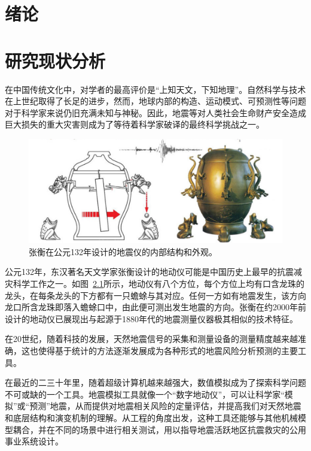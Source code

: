 \documentclass[degree=doctor]{thuthesis}
\begin{document}
\frontmatter

\tableofcontents




\mainmatter

\chapter{绪论}

\chapter{研究现状分析}

在中国传统文化中，对学者的最高评价是“上知天文，下知地理”。自然科学与技术在上世纪取得了长足的进步，然而，地球内部的构造、运动模式、可预测性等问题对于科学家来说仍旧充满未知与神秘。因此，地震等对人类社会生命财产安全造成巨大损失的重大灾害则成为了等待着科学家破译的最终科学挑战之一\citep{anderson1989theory}。

\begin{figure}[t]
\centering
\includegraphics[width=0.7\columnwidth]{seismoscope.png}
\caption{张衡在公元132年设计的地震仪的内部结构和外观\citep{hsiao2009review}。}
\label{fig:heng-scope}
\end{figure}

公元132年，东汉著名天文学家张衡设计的地动仪可能是中国历史上最早的抗震减灾科学工作之一\citep{stein2009introduction}。如图~\ref{fig:heng-scope}所示，地动仪有八个方位，每个方位上均有口含龙珠的龙头，在每条龙头的下方都有一只蟾蜍与其对应。任何一方如有地震发生，该方向龙口所含龙珠即落入蟾蜍口中，由此便可测出发生地震的方向\cite{seismoscopewiki}。张衡在约2000年前设计的地动仪已展现出与起源于1880年代的地震测量仪器极其相似的技术特征。

在20世纪，随着科技的发展，天然地震信号的采集和测量设备的测量精度越来越准确，这也使得基于统计的方法逐渐发展成为各种形式的地震风险分析预测的主要工具。

在最近的二三十年里，随着超级计算机越来越强大，数值模拟成为了探索科学问题不可或缺的一个工具。地震模拟工具就像一个“数字地动仪”，可以让科学家“模拟”或“预测”地震，从而提供对地震相关风险的定量评估，并提高我们对天然地震和底层结构和演变机制的理解。从工程的角度出发，这种工具还能够与其他机械模型耦合，并在不同的场景中进行相关测试，用以指导地震活跃地区抗震救灾的公用事业系统设计。
\end{document}
